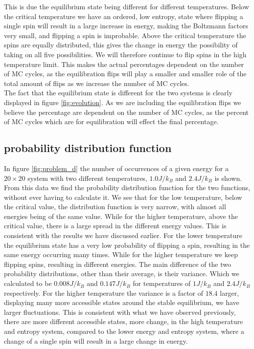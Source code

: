 \documentclass[%
 reprint,
nofootinbib,
aps,
]{revtex4-1}
\begin{document}
This is due the equilibrium state being different for different temperatures. Below the critical temperature we have an ordered, low entropy, state where flipping a single spin will result in a large increase in energy, making the Boltzmann factors very small, and flipping a spin is improbable. Above the critical temperature the spins are equally distributed, this gives the change in energy the possibility of taking on all five possibilities. We will therefore continue to flip spins in the high temperature limit. This makes the actual percentages dependent on the number of MC cycles, as the equilibration flips will play a smaller and smaller role of the total amount of flips as we increase the number of MC cycles.\\
The fact that the equilibrium state is different for the two systems is clearly displayed in figure \vref{fig:evolution}.
As we are including the equilibration flips we believe the percentage are dependent on the number of MC cycles, as the percent of MC cycles which are for equilibration will effect the final percentage.
\subsection{probability distribution function}
In figure \vref{fig:problem_d} the number of occurrences of a given energy for a $20 \times 20$ system with two different temperatures, $1.0J/k_B$ and $2.4J/k_B$ is shown. From this data we find the probability distribution function for the two functions, without ever having to calculate it. We see that for the low temperature, below the critical value, the distribution function is very narrow, with almost all energies being of the same value. While for the higher temperature, above the critical value,  there is a large spread in the different energy values. This is consistent with the results we have discussed earlier. For the lower temperature the equilibrium state has a  very low probability of flipping a spin, resulting in the same energy occurring many times. While for the higher temperature we keep flipping spins, resulting in different energies. The main difference of the two probability distributions, other than their average, is their variance. Which we calculated to be $0.008J/k_B$ and $0.147J/k_B$ for temperatures of $1J/k_B$ and $2.4J/k_B$ respectively. For the higher temperature the variance is a factor of $18.4$ larger, displaying many more accessible states around the stable equilibrium, we have larger fluctuations. This is consistent with what we have observed previously, there are more different accessible states, more change, in the high temperature and entropy system, compared to the lower energy and entropy system, where a change of a single spin will result in a large change in energy.
\end{document}
